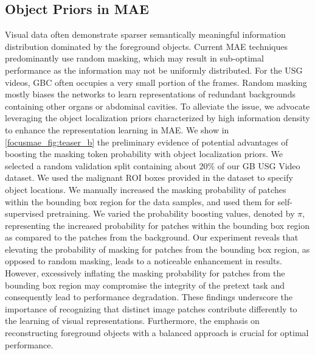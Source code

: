 \subsection{Object Priors in MAE}
%
Visual data often demonstrate sparser semantically meaningful information distribution dominated by the foreground objects. Current MAE techniques predominantly use random masking, which may result in sub-optimal performance as the information may not be uniformly distributed. For the USG videos, GBC often occupies a very small portion of the frames. Random masking mostly biases the networks to learn representations of redundant backgrounds containing other organs or abdominal cavities. To alleviate the issue, %
we advocate leveraging the object localization priors characterized by high information density to enhance the representation learning in MAE.
We show in \cref{focusmae_fig:teaser_b} the preliminary evidence of potential advantages of boosting the masking token probability with object localization priors. We selected a random validation split containing about 20\% of our GB USG Video dataset. We used the malignant ROI boxes provided in the dataset to specify object locations. We manually increased the masking probability of patches within the bounding box region for the data samples, and used them for self-supervised pretraining. We varied the probability boosting values, denoted by $\pi$, representing the increased probability for patches within the bounding box region as compared to the patches from the background. Our experiment reveals that elevating the probability of masking for patches from the bounding box region, as opposed to random masking, leads to a noticeable enhancement in results. %
However, excessively inflating the masking probability for patches from the bounding box region may compromise the integrity of the pretext task and consequently lead to performance degradation.
These findings underscore the importance of recognizing that distinct image patches contribute differently to the learning of visual representations. Furthermore, the emphasis on reconstructing foreground objects with a balanced approach is crucial for optimal performance.

